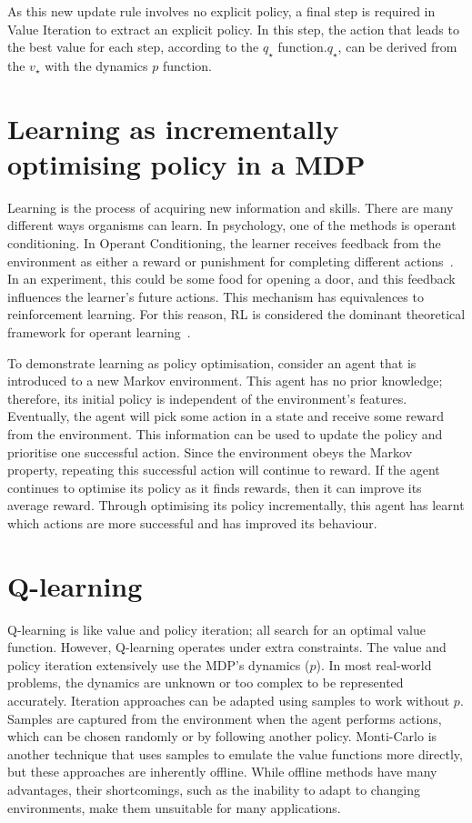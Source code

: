 \documentclass[]{final_report}
\begin{document}
As this new update rule involves no explicit policy, a final step is required in Value Iteration to extract an explicit policy. In this step, the action that leads to the best value for each step, according to the $q_\star$ function.$q_\star$, can be derived from the $v_\star$ with the dynamics $p$ function.


\section{Learning as incrementally optimising policy in a MDP}

Learning is the process of acquiring new information and skills. There are many different ways organisms can learn. In psychology, one of the methods is operant conditioning. In Operant Conditioning, the learner receives feedback from the environment as either a reward or punishment for completing different actions~\cite{staddon2003operant}. In an experiment, this could be some food for opening a door, and this feedback influences the learner's future actions. This mechanism has equivalences to reinforcement learning. For this reason, RL is considered the dominant theoretical framework for operant learning~\cite{shteingart2014reinforcement}. 

To demonstrate learning as policy optimisation, consider an agent that is introduced to a new Markov environment. This agent has no prior knowledge; therefore, its initial policy is independent of the environment's features. Eventually, the agent will pick some action in a state and receive some reward from the environment. This information can be used to update the policy and prioritise one successful action. Since the environment obeys the Markov property, repeating this successful action will continue to reward. If the agent continues to optimise its policy as it finds rewards, then it can improve its average reward. Through optimising its policy incrementally, this agent has learnt which actions are more successful and has improved its behaviour.

\section{Q-learning}\label{chap:q-learning}


Q-learning is like value and policy iteration; all search for an optimal value function. However, Q-learning operates under extra constraints. The value and policy iteration extensively use the MDP's dynamics ($p$). In most real-world problems, the dynamics are unknown or too complex to be represented accurately. Iteration approaches can be adapted using samples to work without $p$. Samples are captured from the environment when the agent performs actions, which can be chosen randomly or by following another policy. Monti-Carlo is another technique that uses samples to emulate the value functions more directly, but these approaches are inherently offline. While offline methods have many advantages, their shortcomings, such as the inability to adapt to changing environments, make them unsuitable for many applications. 
\end{document}
